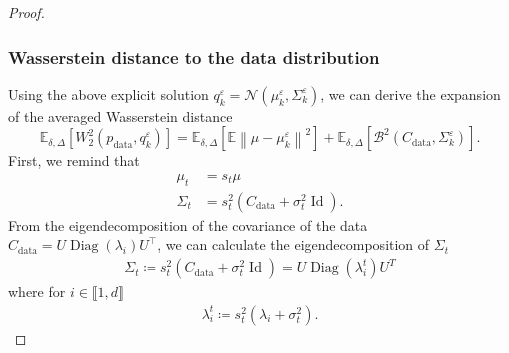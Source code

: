 \documentclass[11pt]{article}
\newcommand{\norm}[1]{\left\|{#1}\right\|}
\newcommand{\eqdef}{\coloneqq}
\newcommand{\id}{\operatorname{Id}}
\newcommand{\EE}{\mathbb{E}}
\begin{document}
\begin{proof}
\subsubsection{Wasserstein distance to the data distribution}
Using the above explicit solution $q^\varepsilon_k = \mathcal{N}(\mu^\varepsilon_k, \Sigma^\varepsilon_k)$, we can derive the expansion of the averaged Wasserstein distance 
\begin{equation*} 
    \EE_{\delta, \Delta} \left[W_2^2(p_\mathrm{data},q_k^\varepsilon)\right] =   \EE_{\delta, \Delta} \left[ \EE\norm{\mu - \mu_k^\varepsilon}^2 \right]+   \EE_{\delta, \Delta} \left[ \mathcal{B}^2(C_\mathrm{data}, \Sigma_k^{\varepsilon}) \right].
\end{equation*}
First, we remind that 
\begin{align*}
    \mu_t &= s_t \mu \\
    \Sigma_t &= s_t^2 ( C_{\mathrm{data}} + \sigma_t^2 \id).
\end{align*}
From the eigendecomposition of the covariance of the data $C_{\mathrm{data}} = U \operatorname{Diag}(\lambda_i) U^\top$, we can calculate the eigendecomposition of $\Sigma_t$
\begin{align*}
\Sigma_t \eqdef  s_t^2 ( C_{\mathrm{data}} + \sigma_t^2 \id) = U \operatorname{Diag}\left(\lambda^t_i\right) U^T
\end{align*}
where for $i \in \llbracket 1,d \rrbracket$
\begin{align*}
 \lambda^t_i \eqdef s_t^2 (\lambda_i + \sigma_t^2) .
\end{align*}


\end{proof}
\end{document}
